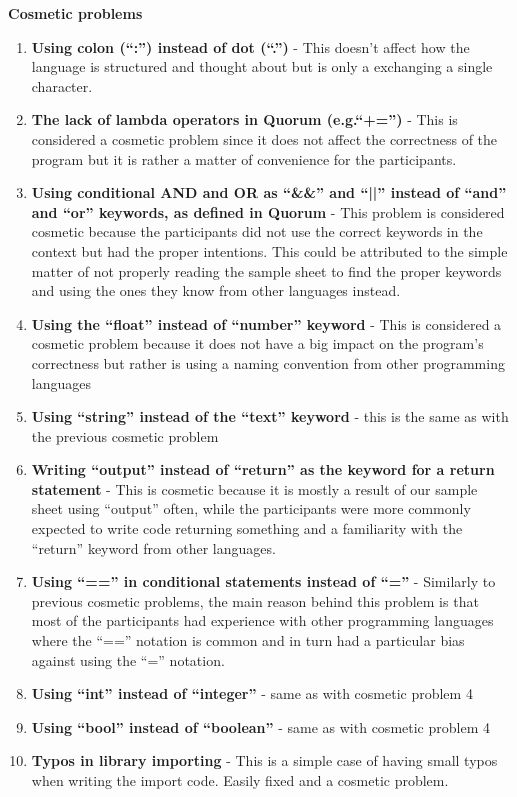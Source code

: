 \textbf{Cosmetic problems}
\begin{enumerate}
\item \textbf{Using colon (“:”) instead of dot (“.”)} - This doesn’t affect how the language is structured and thought about but is only a exchanging a single character.
\item \textbf{The lack of lambda operators in Quorum (e.g.“+=”)} - This is considered a cosmetic problem since it does not affect the correctness of the program but it is rather a matter of convenience for the participants.
\item \textbf{Using conditional AND and OR as “\&\&” and “||” instead of “and” and “or” keywords, as defined in Quorum}  - This problem is considered cosmetic because the participants did not use the correct keywords in the context but had the proper intentions. This could be attributed to the simple matter of not properly reading the sample sheet to find the proper keywords and using the ones they know from other languages instead.
\item \textbf{Using the “float” instead of “number” keyword} - This is considered a cosmetic problem because it does not have a big impact on the program’s correctness but rather is using a naming convention from other programming languages
\item \textbf{Using “string” instead of the “text” keyword} - this is the same as with the previous cosmetic problem
\item \textbf{Writing “output” instead of “return” as the keyword for a return statement} - This is cosmetic because it is mostly a result of our sample sheet using “output” often, while the participants were more commonly expected to write code returning something and a familiarity with the “return” keyword from other languages.
\item \textbf{Using “==” in conditional statements instead of “=”} - Similarly to previous cosmetic problems, the main reason behind this problem is that most of the participants had experience with other programming languages where the “==” notation is common and in turn had a particular bias against using the “=” notation.
\item \textbf{Using “int” instead of “integer”}  - same as with cosmetic problem 4
\item \textbf{Using “bool” instead of “boolean”} - same as with cosmetic problem 4
\item \textbf{Typos in library importing} - This is a simple case of having small typos when writing the import code. Easily fixed and a cosmetic problem.

\end{enumerate}
